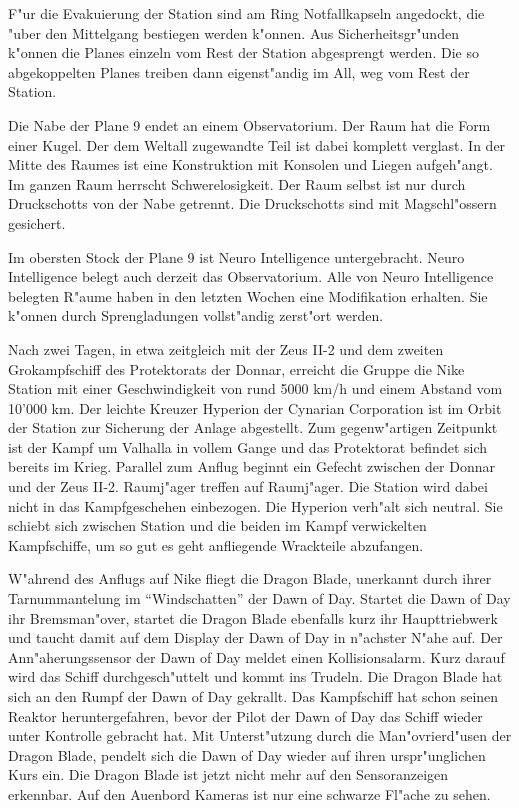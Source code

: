 F"ur die Evakuierung der Station sind am Ring Notfallkapseln angedockt, die "uber den Mittelgang bestiegen werden k"onnen. Aus Sicherheitsgr"unden k"onnen die Planes einzeln vom Rest der Station abgesprengt werden. Die so abgekoppelten Planes treiben dann eigenst"andig im All, weg vom Rest der Station. 

Die Nabe der Plane 9 endet an einem Observatorium. Der Raum hat die Form einer Kugel. Der dem Weltall zugewandte Teil ist dabei komplett verglast. In der Mitte des Raumes ist eine Konstruktion mit Konsolen und Liegen aufgeh"angt. Im ganzen Raum herrscht Schwerelosigkeit. Der Raum selbst ist nur durch Druckschotts von der Nabe getrennt. Die Druckschotts sind mit Magschl"ossern gesichert. 

Im obersten Stock der Plane 9 ist Neuro Intelligence untergebracht. Neuro Intelligence belegt auch derzeit das Observatorium. Alle von Neuro Intelligence belegten R"aume haben in den letzten Wochen eine Modifikation erhalten. Sie k"onnen durch Sprengladungen vollst"andig zerst"ort werden.



Nach zwei Tagen, in etwa zeitgleich mit der Zeus II-2 und dem zweiten Gro\3kampfschiff des Protektorats der Donnar, erreicht die Gruppe die Nike Station mit einer Geschwindigkeit von rund 5000 km/h und einem Abstand vom 10'000 km. Der leichte Kreuzer Hyperion der Cynarian Corporation ist im Orbit der Station zur Sicherung der Anlage abgestellt. Zum gegenw"artigen Zeitpunkt ist der Kampf um Valhalla in vollem Gange und das Protektorat befindet sich bereits im Krieg. Parallel zum Anflug beginnt ein Gefecht zwischen der Donnar und der Zeus II-2. Raumj"ager treffen auf Raumj"ager. Die Station wird dabei nicht in das Kampfgeschehen einbezogen. Die Hyperion verh"alt sich neutral. Sie schiebt sich zwischen Station und die beiden im Kampf verwickelten Kampfschiffe, um so gut es geht anfliegende Wrackteile abzufangen.

W"ahrend des Anflugs auf Nike fliegt die Dragon Blade, unerkannt durch ihrer Tarnummantelung im ``Windschatten'' der Dawn of Day. Startet die Dawn of Day ihr Bremsman"over, startet die Dragon Blade ebenfalls kurz ihr Haupttriebwerk und taucht damit auf dem Display der Dawn of Day in n"achster N"ahe auf. Der Ann"aherungssensor der Dawn of Day meldet einen Kollisionsalarm. Kurz darauf wird das Schiff durchgesch"uttelt und kommt ins Trudeln. Die Dragon Blade hat sich an den Rumpf der Dawn of Day gekrallt. Das Kampfschiff hat schon seinen Reaktor heruntergefahren, bevor der Pilot der Dawn of Day das Schiff wieder unter Kontrolle gebracht hat. Mit Unterst"utzung durch die Man"ovrierd"usen der Dragon Blade, pendelt sich die Dawn of Day wieder auf ihren urspr"unglichen Kurs ein. Die Dragon Blade ist jetzt nicht mehr auf den Sensoranzeigen erkennbar. Auf den Au\3enbord Kameras ist nur eine schwarze Fl"ache zu sehen.


